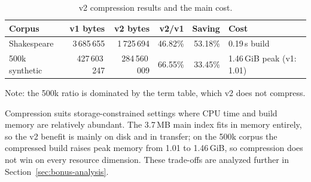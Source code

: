 \begin{table}[!htbp]
  \centering
  \caption{v2 compression results and the main cost.}
  \label{tab:compression}
  \small
  \begin{tabularx}{\linewidth}{X r r r r l}
    \toprule
    Corpus & v1 bytes & v2 bytes & v2/v1 & Saving & Cost \\
    \midrule
    Shakespeare & 3\,685\,655 & 1\,725\,694 & 46.82\% & 53.18\% & 0.19\,s build \\
    500k synthetic & 427\,603\,247 & 284\,560\,009 & 66.55\% & 33.45\% & 1.46\,GiB peak (v1: 1.01) \\
    \bottomrule
  \end{tabularx}
  \par\smallskip
  \footnotesize Note: the 500k ratio is dominated by the term table, which v2
  does not compress.
\end{table}

Compression suits storage-constrained settings where CPU time and build memory
are relatively abundant. The 3.7\,MB main index fits in memory entirely, so the
v2 benefit is mainly on disk and in transfer; on the 500k corpus the compressed
build raises peak memory from 1.01 to 1.46\,GiB, so compression does not win on
every resource dimension. These trade-offs are analyzed further in
Section~\ref{sec:bonus-analysis}.
